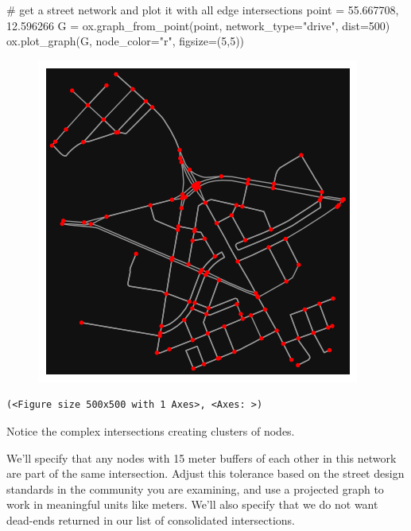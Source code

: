 \documentclass[
  letterpaper,
  DIV=11,
  numbers=noendperiod]{scrreprt}
\newenvironment{Shaded}{\begin{snugshade}}{\end{snugshade}}
\newcommand{\CommentTok}[1]{\textcolor[rgb]{0.37,0.37,0.37}{#1}}
\newcommand{\DecValTok}[1]{\textcolor[rgb]{0.68,0.00,0.00}{#1}}
\newcommand{\FloatTok}[1]{\textcolor[rgb]{0.68,0.00,0.00}{#1}}
\newcommand{\NormalTok}[1]{\textcolor[rgb]{0.00,0.23,0.31}{#1}}
\newcommand{\OperatorTok}[1]{\textcolor[rgb]{0.37,0.37,0.37}{#1}}
\newcommand{\StringTok}[1]{\textcolor[rgb]{0.13,0.47,0.30}{#1}}
\begin{document}
\begin{Shaded}
\begin{Highlighting}[]
\CommentTok{\# get a street network and plot it with all edge intersections}
\NormalTok{point }\OperatorTok{=} \FloatTok{55.667708}\NormalTok{, }\FloatTok{12.596266}
\NormalTok{G }\OperatorTok{=}\NormalTok{ ox.graph\_from\_point(point, network\_type}\OperatorTok{=}\StringTok{"drive"}\NormalTok{, dist}\OperatorTok{=}\DecValTok{500}\NormalTok{)}
\NormalTok{ox.plot\_graph(G, node\_color}\OperatorTok{=}\StringTok{"r"}\NormalTok{, figsize}\OperatorTok{=}\NormalTok{(}\DecValTok{5}\NormalTok{,}\DecValTok{5}\NormalTok{))}
\end{Highlighting}
\end{Shaded}

\begin{figure}[H]

{\centering \includegraphics{labs/w07_OSM_files/figure-pdf/cell-18-output-1.png}

}

\end{figure}

\begin{verbatim}
(<Figure size 500x500 with 1 Axes>, <Axes: >)
\end{verbatim}

Notice the complex intersections creating clusters of nodes.

We'll specify that any nodes with 15 meter buffers of each other in this
network are part of the same intersection. Adjust this tolerance based
on the street design standards in the community you are examining, and
use a projected graph to work in meaningful units like meters. We'll
also specify that we do not want dead-ends returned in our list of
consolidated intersections.
\end{document}
